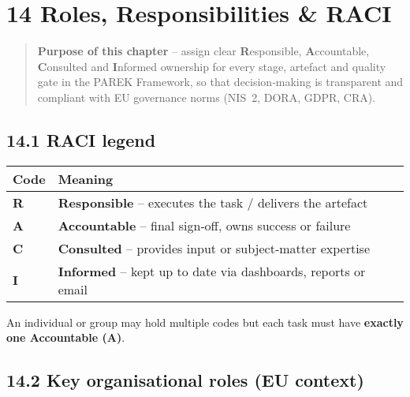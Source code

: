 \documentclass[
  english,
]{article}
\begin{document}
\section{14 Roles, Responsibilities \&
RACI}\label{roles-responsibilities-raci}

\begin{quote}
\textbf{Purpose of this chapter} -- assign clear \textbf{R}esponsible,
\textbf{A}ccountable, \textbf{C}onsulted and \textbf{I}nformed ownership
for every stage, artefact and quality gate in the PAREK Framework, so
that decision‑making is transparent and compliant with EU governance
norms (NIS~2, DORA, GDPR, CRA).
\end{quote}

\subsection{14.1 RACI legend}\label{raci-legend}

\begin{longtable}[]{@{}
  >{\raggedright\arraybackslash}p{}
  >{\raggedright\arraybackslash}p{}@{}}
\toprule\noalign{}
\begin{minipage}[b]{\linewidth}\raggedright
Code
\end{minipage} & \begin{minipage}[b]{\linewidth}\raggedright
Meaning
\end{minipage} \\
\midrule\noalign{}
\endhead
\bottomrule\noalign{}
\endlastfoot
\textbf{R} & \textbf{Responsible} -- executes the task / delivers the
artefact \\
\textbf{A} & \textbf{Accountable} -- final sign‑off, owns success or
failure \\
\textbf{C} & \textbf{Consulted} -- provides input or subject‑matter
expertise \\
\textbf{I} & \textbf{Informed} -- kept up to date via dashboards,
reports or email \\
\end{longtable}

An individual or group may hold multiple codes but each task must have
\textbf{exactly one Accountable (A)}.

\subsection{14.2 Key organisational roles (EU
context)}\label{key-organisational-roles-eu-context}
\end{document}
